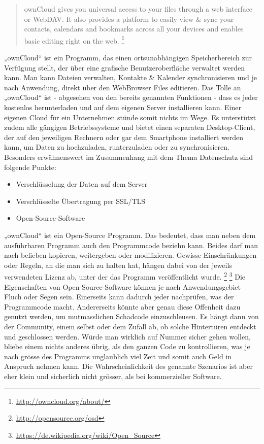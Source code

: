 \begin{quote}
ownCloud gives you universal access to your files through a web interface or WebDAV. It also provides a platform to easily view \& sync your contacts, calendars and bookmarks across all your devices and enables basic editing right on the web.
\footnote{\url{http://owncloud.org/about/}}	
\end{quote}

„ownCloud“ ist ein Programm, das einen ortsunabhängigen Speicherbereich zur Verfügung stellt, der über eine grafische Benutzeroberfläche verwaltet werden kann. Man kann Dateien verwalten, Kontakte \& Kalender synchronisieren und je nach Anwendung, direkt über den WebBrowser Files editieren. Das Tolle an „ownCloud“ ist - abgesehen von den bereits genannten Funktionen - dass es jeder kostenlos herunterladen und auf dem eigenen Server installieren kann. Einer eigenen Cloud für ein Unternehmen stünde somit nichts im Wege. Es unterstützt zudem alle gängigen Betriebssysteme und bietet einen separaten Desktop-Client, der auf den jeweiligen Rechnern oder gar dem Smartphone installiert werden kann, um Daten zu hochzuladen, runterzuladen oder zu synchronisieren.
Besonders erwähnenswert im Zusammenhang mit dem Thema Datenschutz sind folgende Punkte:

\begin{itemize}
\item Verschlüsselung der Daten auf dem Server
\item Verschlüsselte Übertragung per SSL/TLS
\item Open-Source-Software
\end{itemize}

„ownCloud“ ist ein Open-Source Programm. Das bedeutet, dass man neben dem ausführbaren Programm auch den Programmcode beziehn kann. Beides darf man nach belieben kopieren, weitergeben oder modifizieren. Gewisse Einschränkungen oder Regeln, an die man sich zu halten hat, hängen dabei von der jeweils verwendeten Lizenz ab, unter der das Programm veröffentlicht wurde.
\footnote{\url{http://opensource.org/osd}} 
\footnote{\url{https://de.wikipedia.org/wiki/Open_Source}} 
Die Eigenschaften von Open-Source-Software können je nach Anwendungsgebiet Fluch oder Segen sein. Einerseits kann dadurch jeder nachprüfen, was der Programmcode macht. Andererseits könnte aber genau diese Offenheit dazu genutzt werden, um mutmasslichen Schadcode einzuschleusen. Es hängt dann von der Community, einem selbst oder dem Zufall ab, ob solche Hintertüren entdeckt und geschlossen werden. Würde man wirklich auf Nummer sicher gehen wollen, bliebe einem nichts anderes übrig, als den ganzen Code zu kontrollieren, was je nach grösse des Programms unglaublich viel Zeit und somit auch Geld in Anspruch nehmen kann. Die Wahrscheinlichkeit des genannte Szenarios ist aber eher klein und sicherlich nicht grösser, als bei kommerzieller Software.

